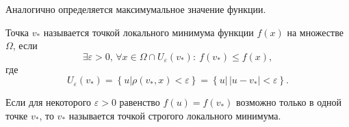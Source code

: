 Аналогично определяется максимумальное значение функции.

\begin{definition}
	Точка $v_*$ называется точкой локального минимума функции $f(x)$ на множестве $\Omega$, если
	\begin{equation*}
		\exists \varepsilon > 0,\, \forall x \in \Omega \cap U_\varepsilon(v_*):\:
		f(v_*)\leq f(x),
	\end{equation*}
	где
	\begin{equation*}
		U_\varepsilon(v_*) = \left\{u \big| \rho(v_*,x)<\varepsilon\right\} = \left\{u \big|\, |u-v_*|<\varepsilon\right\}.
	\end{equation*}
\end{definition}

\begin{definition}
	Если для некоторого $\varepsilon > 0$ равенство $f(u)=f(v_*)$ возможно только в одной точке $v_*$, то $v_*$ называется точкой строгого локального минимума.
\end{definition}

